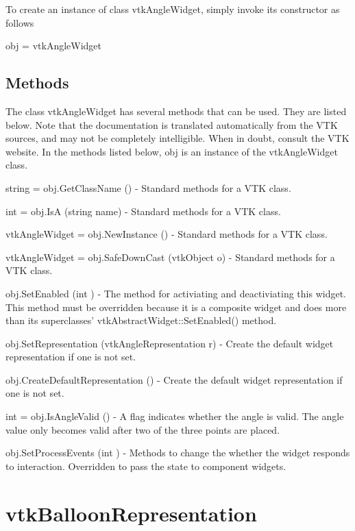To create an instance of class vtk\-Angle\-Widget, simply invoke its constructor as follows \begin{DoxyVerb}  obj = vtkAngleWidget
\end{DoxyVerb}
 \hypertarget{vtkwidgets_vtkxyplotwidget_Methods}{}\subsection{Methods}\label{vtkwidgets_vtkxyplotwidget_Methods}
The class vtk\-Angle\-Widget has several methods that can be used. They are listed below. Note that the documentation is translated automatically from the V\-T\-K sources, and may not be completely intelligible. When in doubt, consult the V\-T\-K website. In the methods listed below, {\ttfamily obj} is an instance of the vtk\-Angle\-Widget class. 
\begin{DoxyItemize}
\item {\ttfamily string = obj.\-Get\-Class\-Name ()} -\/ Standard methods for a V\-T\-K class.  
\item {\ttfamily int = obj.\-Is\-A (string name)} -\/ Standard methods for a V\-T\-K class.  
\item {\ttfamily vtk\-Angle\-Widget = obj.\-New\-Instance ()} -\/ Standard methods for a V\-T\-K class.  
\item {\ttfamily vtk\-Angle\-Widget = obj.\-Safe\-Down\-Cast (vtk\-Object o)} -\/ Standard methods for a V\-T\-K class.  
\item {\ttfamily obj.\-Set\-Enabled (int )} -\/ The method for activiating and deactiviating this widget. This method must be overridden because it is a composite widget and does more than its superclasses' vtk\-Abstract\-Widget\-::\-Set\-Enabled() method.  
\item {\ttfamily obj.\-Set\-Representation (vtk\-Angle\-Representation r)} -\/ Create the default widget representation if one is not set.  
\item {\ttfamily obj.\-Create\-Default\-Representation ()} -\/ Create the default widget representation if one is not set.  
\item {\ttfamily int = obj.\-Is\-Angle\-Valid ()} -\/ A flag indicates whether the angle is valid. The angle value only becomes valid after two of the three points are placed.  
\item {\ttfamily obj.\-Set\-Process\-Events (int )} -\/ Methods to change the whether the widget responds to interaction. Overridden to pass the state to component widgets.  
\end{DoxyItemize}\hypertarget{vtkwidgets_vtkballoonrepresentation}{}\section{vtk\-Balloon\-Representation}\label{vtkwidgets_vtkballoonrepresentation}
